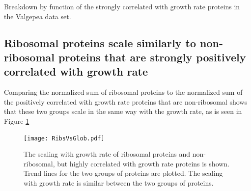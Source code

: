 \documentclass[notitlepage]{article}
\begin{document}
\begin{table}[H]
\centering
\caption{Breakdown by function of the strongly correlated with growth rate proteins in the Valgepea data set.}
\label{tab:corrbreakdownv}
\end{table}
\subsection{Ribosomal proteins scale similarly to non-ribosomal proteins that are strongly positively correlated with growth rate}
Comparing the normalized sum of ribosomal proteins to the normalized sum of the positively correlated with growth rate proteins that are non-ribosomal shows that these two groups scale in the same way with the growth rate, as is seen in Figure \ref{fig:ribsnonribs}
\begin{figure}[H]
\centering
\texttt{[image: RibsVsGlob.pdf]}
\caption{
  The scaling with growth rate of ribosomal proteins and non-ribosomal, but highly correlated with growth rate proteins is shown.
Trend lines for the two groups of proteins are plotted.
The scaling with growth rate is similar between the two groups of proteins.
}
\label{fig:ribsnonribs}
\end{figure}
\printbibliography
\end{document}
